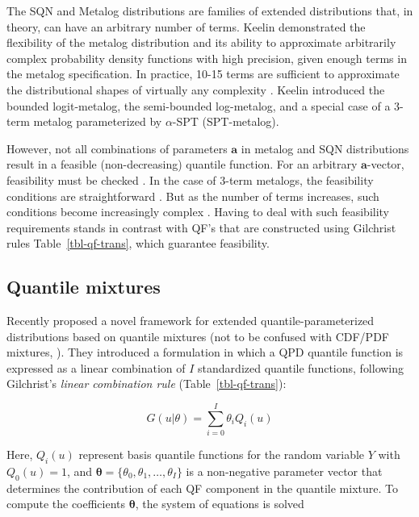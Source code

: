 \documentclass[
  fleqn,
  deca,
  blindrev
]{informs4}
\begin{document}
The SQN and Metalog distributions are families of extended distributions
that, in theory, can have an arbitrary number of terms. Keelin
\citep{keelin2016MetalogDistributions} demonstrated the flexibility of
the metalog distribution and its ability to approximate arbitrarily
complex probability density functions with high precision, given enough
terms in the metalog specification. In practice, 10-15 terms are
sufficient to approximate the distributional shapes of virtually any
complexity \citep{keelin2021MetalogDistributionsVirtually}. Keelin
\citep{keelin2016MetalogDistributions} introduced the bounded
logit-metalog, the semi-bounded log-metalog, and a special case of a
3-term metalog parameterized by \(\alpha\)-SPT (SPT-metalog).

However, not all combinations of parameters \(\mathbf{a}\) in metalog
and SQN distributions result in a feasible (non-decreasing) quantile
function. For an arbitrary \(\mathbf{a}\)-vector, feasibility must be
checked \citep{keelin2011QuantileParameterizedDistributions}. In the
case of 3-term metalogs, the feasibility conditions are straightforward
\citep{keelin2016MetalogDistributions}. But as the number of terms
increases, such conditions become increasingly complex
\citep{keelin2017MetalogDistributionsFeasibility}. Having to deal with
such feasibility requirements stands in contrast with QF's that are
constructed using Gilchrist rules Table~\ref{tbl-qf-trans}, which
guarantee feasibility.

\subsection{Quantile mixtures}\label{quantile-mixtures}

Recently \citep{peng2023MixtureQuantilesEstimated} proposed a novel
framework for extended quantile-parameterized distributions based on
quantile mixtures (not to be confused with CDF/PDF mixtures,
\citep[107]{gilchrist2000StatisticalModellingQuantile}). They introduced
a formulation in which a QPD quantile function is expressed as a linear
combination of \(I\) standardized quantile functions, following
Gilchrist's \emph{linear combination rule} (Table~\ref{tbl-qf-trans}):

\[
G(u\vert\theta)=\sum_{i=0}^I\theta_iQ_i(u)
\]

Here, \(Q_i(u)\) represent basis quantile functions for the random
variable \(Y\) with \(Q_0(u)=1\), and
\(\pmb\theta=\{\theta_0,\theta_1,\dots,\theta_I\}\) is a non-negative
parameter vector that determines the contribution of each QF component
in the quantile mixture. To compute the coefficients \(\pmb\theta\), the
system of equations is solved
\end{document}
